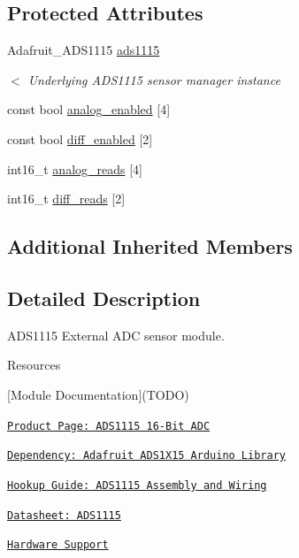 \subsection*{Protected Attributes}
\begin{DoxyCompactItemize}
\item 
Adafruit\+\_\+\+A\+D\+S1115 \hyperlink{class_loom___a_d_s1115_a3e415ba1bcb735a7c68f3d8186af16ff}{ads1115}
\begin{DoxyCompactList}\small\item\em $<$ Underlying A\+D\+S1115 sensor manager instance \end{DoxyCompactList}\item 
const bool \hyperlink{class_loom___a_d_s1115_adae846869b16a628b143b58a4cbafe66}{analog\+\_\+enabled} \mbox{[}4\mbox{]}
\item 
const bool \hyperlink{class_loom___a_d_s1115_a61952169aa13145525c1ad60ff13de9c}{diff\+\_\+enabled} \mbox{[}2\mbox{]}
\item 
int16\+\_\+t \hyperlink{class_loom___a_d_s1115_a069b993572153286feab41c0467342a4}{analog\+\_\+reads} \mbox{[}4\mbox{]}
\item 
int16\+\_\+t \hyperlink{class_loom___a_d_s1115_a8f56df6850f8837b029f0f52515a3f38}{diff\+\_\+reads} \mbox{[}2\mbox{]}
\end{DoxyCompactItemize}
\subsection*{Additional Inherited Members}


\subsection{Detailed Description}
A\+D\+S1115 External A\+DC sensor module. 

\begin{DoxyParagraph}{Resources}

\begin{DoxyItemize}
\item \mbox{[}Module Documentation\mbox{]}(T\+O\+DO)
\item \href{https://www.adafruit.com/product/1085}{\tt Product Page\+: A\+D\+S1115 16-\/\+Bit A\+DC}
\item \href{https://github.com/adafruit/Adafruit_ADS1X15}{\tt Dependency\+: Adafruit A\+D\+S1\+X15 Arduino Library}
\item \href{https://learn.adafruit.com/adafruit-4-channel-adc-breakouts/assembly-and-wiring}{\tt Hookup Guide\+: A\+D\+S1115 Assembly and Wiring}
\item \href{https://cdn-shop.adafruit.com/datasheets/ads1115.pdf}{\tt Datasheet\+: A\+D\+S1115}
\item \href{https://github.com/OPEnSLab-OSU/Loom/wiki/Hardware-Support#ads1115-16-bit-adc}{\tt Hardware Support} 
\end{DoxyItemize}
\end{DoxyParagraph}



